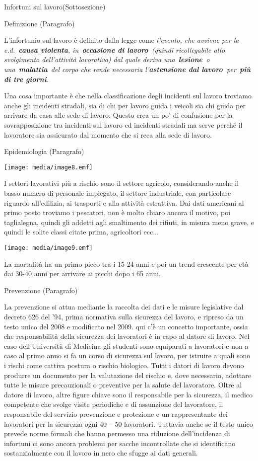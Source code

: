 \documentclass[]{article}
\begin{document}
Infortuni sul lavoro(Sottosezione)

Definizione (Paragrafo)

L'infortunio sul lavoro è definito dalla legge come \emph{l'evento, che
avviene per la c.d.~\textbf{causa violenta}, in~\textbf{occasione di
lavoro}~(quindi ricollegabile allo svolgimento dell'attività lavorativa)
dal quale deriva una~\textbf{lesione}~o una~\textbf{malattia}~del corpo
che rende necessaria l'\textbf{astensione dal lavoro~}per~\textbf{più di
tre giorni}.}

Una cosa importante è che nella classificazione degli incidenti sul
lavoro troviamo anche gli incidenti stradali, sia di chi per lavoro
guida i veicoli sia chi guida per arrivare da casa alle sede di lavoro.
Questo crea un po' di confusione per la sovrapposizione tra incidenti
sul lavoro ed incidenti stradali ma serve perché il lavoratore sia
assicurato dal momento che si reca alla sede di lavoro.

Epidemiologia (Paragrafo)

\texttt{[image: media/image8.emf]}

I settori lavorativi più a rischio sono il settore agricolo,
considerando anche il basso numero di personale impiegato, il settore
industriale, con particolare riguardo all'edilizia, ai trasporti e alla
attività estrattiva. Dai dati americani al primo posto troviamo i
pescatori, non è molto chiaro ancora il motivo, poi taglialegna, quindi
gli addetti agli smaltimento dei rifiuti, in misura meno grave, e quindi
le solite classi citate prima, agricoltori ecc...

\texttt{[image: media/image9.emf]}

La mortalità ha un primo picco tra i 15-24 anni e poi un trend crescente
per età dai 30-40 anni per arrivare ai picchi dopo i 65 anni.

Prevenzione (Paragrafo)

La prevenzione si attua mediante la raccolta dei dati e le misure
legislative dal decreto 626 del '94, prima normativa sulla sicurezza del
lavoro, e ripreso da un testo unico del 2008 e modificato nel 2009. qui
c'è un concetto importante, ossia che responsabilità della sicurezza dei
lavoratori è in capo al datore di lavoro. Nel caso dell'Università di
Medicina gli studenti sono equiparati a lavoratori e non a caso al primo
anno si fa un corso di sicurezza sul lavoro, per istruire a quali sono i
rischi come cattiva postura o rischio biologico. Tutti i datori di
lavoro devono produrre un documento per la valutazione del rischio e,
dove necessario, adottare tutte le misure precauzionali o preventive per
la salute del lavoratore. Oltre al datore di lavoro, altre figure chiave
sono il responsabile per la sicurezza, il medico competente che svolge
visite periodiche e di assunzione del lavoratore, il responsabile del
servizio prevenzione e protezione e un rappresentante dei lavoratori per
la sicurezza ogni 40 -- 50 lavoratori. Tuttavia anche se il testo unico
prevede norme formali che hanno permesso una riduzione dell'incidenza di
infortuni ci sono ancora problemi per sacche incontrollate che si
identificano sostanzialmente con il lavoro in nero che sfugge ai dati
generali.
\end{document}
